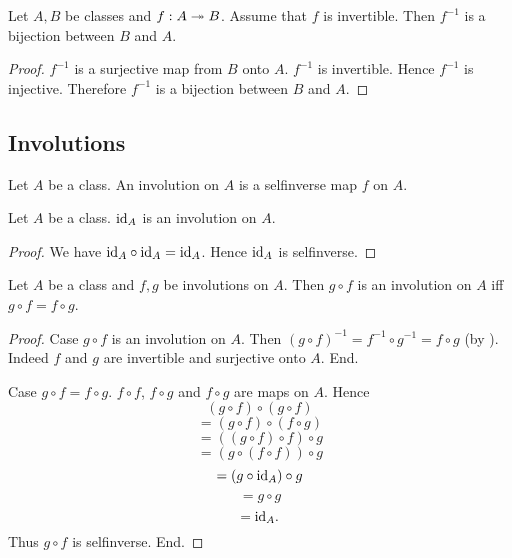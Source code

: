 \documentclass[10pt]{article}
\begin{document}
  \begin{forthel}
    \begin{corollary}[id=FOUNDATIONS_09_5708971514003456,printid]
      Let $A, B$ be classes and $f : A \twoheadrightarrow B$.
      Assume that $f$ is invertible.
      Then $f^{-1}$ is a bijection between $B$ and $A$.
    \end{corollary}
    \begin{proof}
      $f^{-1}$ is a surjective map from $B$ onto $A$.
      $f^{-1}$ is invertible.
      Hence $f^{-1}$ is injective.
      Therefore $f^{-1}$ is a bijection between $B$ and $A$.
    \end{proof}
  \end{forthel}


  \subsection*{Involutions}

  \begin{forthel}
    \begin{definition}[id=FOUNDATIONS_09_7282039688527872,printid]
      Let $A$ be a class.
      An involution on $A$ is a selfinverse map $f$ on $A$.
    \end{definition}
  \end{forthel}

  \begin{forthel}
    \begin{proposition}[id=FOUNDATIONS_09_7944474185433088,printid]
      Let $A$ be a class.
      $\textrm{id}_{A}$ is an involution on $A$.
    \end{proposition}
    \begin{proof}
      We have $\textrm{id}_{A} \circ \textrm{id}_{A} = \textrm{id}_{A}$.
      Hence $\textrm{id}_{A}$ is selfinverse.
    \end{proof}
  \end{forthel}

  \begin{forthel}
    \begin{proposition}[id=FOUNDATIONS_09_6897019612299264,printid]
      Let $A$ be a class and $f, g$ be involutions on $A$.
      Then $g \circ f$ is an involution on $A$ iff $g \circ f = f \circ g$.
    \end{proposition}
    \begin{proof}
      Case $g \circ f$ is an involution on $A$.
        Then $(g \circ f)^{-1}
          = f^{-1} \circ g^{-1}
          = f \circ g$
        (by ).
        Indeed $f$ and $g$ are invertible and surjective onto $A$.
      End.

      Case $g \circ f = f \circ g$.
        $f \circ f$, $f \circ g$ and $f \circ g$ are maps on $A$.
        Hence
        \[  (g \circ f) \circ (g \circ f)       \]
        \[    = (g \circ f) \circ (f \circ g)   \]
        \[    = ((g \circ f) \circ f) \circ g   \]
        \[    = (g \circ (f \circ f)) \circ g   \]
        \[    = (g \circ \textrm{id}_{A}) \circ g       \]
        \[    = g \circ g                       \]
        \[    = \textrm{id}_{A}.                        \]
        Thus $g \circ f$ is selfinverse.
      End.
    \end{proof}
  \end{forthel}
\end{document}
